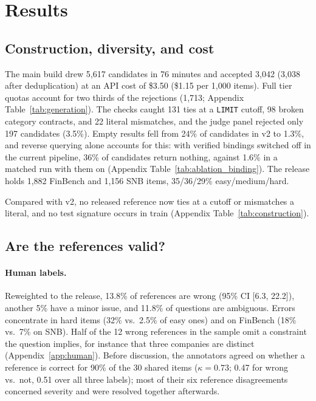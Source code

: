 \documentclass[11pt]{article}
\newcommand{\cy}[1]{\texttt{\small #1}}
\begin{document}
\section{Results}
\subsection{Construction, diversity, and cost}
\label{sec:construction}
The main build drew 5,617 candidates in 76 minutes and accepted 3,042 (3,038 after deduplication) at an API cost of \$3.50 (\$1.15 per 1,000 items). Full tier quotas account for two thirds of the rejections (1,713; Appendix Table~\ref{tab:generation}). The checks caught 131 ties at a \cy{LIMIT} cutoff, 98 broken category contracts, and 22 literal mismatches, and the judge panel rejected only 197 candidates (3.5\%). Empty results fell from 24\% of candidates in v2 to 1.3\%, and reverse querying alone accounts for this: with verified bindings switched off in the current pipeline, 36\% of candidates return nothing, against 1.6\% in a matched run with them on (Appendix Table~\ref{tab:ablation_binding}). The release holds 1,882 FinBench and 1,156 SNB items, 35/36/29\% easy/medium/hard.

Compared with v2, no released reference now ties at a cutoff or mismatches a literal, and no test signature occurs in train (Appendix Table~\ref{tab:construction}).

\subsection{Are the references valid?}
\label{sec:validity}
\paragraph{Human labels.} Reweighted to the release, 13.8\% of references are wrong (95\% CI [6.3, 22.2]), another 5\% have a minor issue, and 11.8\% of questions are ambiguous. Errors concentrate in hard items (32\% vs.\ 2.5\% of easy ones) and on FinBench (18\% vs.\ 7\% on SNB). Half of the 12 wrong references in the sample omit a constraint the question implies, for instance that three companies are distinct (Appendix~\ref{app:human}). Before discussion, the annotators agreed on whether a reference is correct for 90\% of the 30 shared items ($\kappa=0.73$; 0.47 for wrong vs.\ not, 0.51 over all three labels); most of their six reference disagreements concerned severity and were resolved together afterwards.
\end{document}
